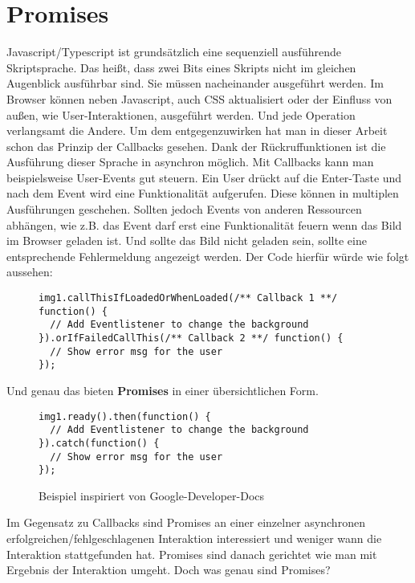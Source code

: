 \section{Promises}

Javascript/Typescript ist grundsätzlich eine sequenziell ausführende Skriptsprache. Das heißt,  dass zwei Bits eines Skripts nicht im gleichen Augenblick ausführbar sind. Sie müssen nacheinander ausgeführt werden. Im Browser können neben Javascript, auch CSS aktualisiert oder der Einfluss von außen, wie User-Interaktionen, ausgeführt werden. Und jede Operation verlangsamt die Andere. Um dem entgegenzuwirken hat man in dieser Arbeit schon das Prinzip der Callbacks gesehen. Dank der Rückruffunktionen ist die Ausführung dieser Sprache in asynchron möglich. Mit Callbacks kann man beispielsweise User-Events gut steuern. Ein User drückt auf die Enter-Taste und nach dem Event wird eine Funktionalität aufgerufen. Diese können in multiplen Ausführungen geschehen. Sollten jedoch Events von anderen Ressourcen abhängen, wie z.B. das Event darf erst eine Funktionalität \glqq{}feuern\grqq{} wenn das Bild im Browser geladen ist. Und sollte das Bild nicht geladen sein, sollte eine entsprechende Fehlermeldung angezeigt werden. Der Code hierfür würde wie folgt aussehen:

\begin{figure}[H]
\begin{lstlisting}
img1.callThisIfLoadedOrWhenLoaded(/** Callback 1 **/ function() {
  // Add Eventlistener to change the background
}).orIfFailedCallThis(/** Callback 2 **/ function() {
  // Show error msg for the user
});
\end{lstlisting}
\end{figure}

\noindent
Und genau das bieten \textbf{Promises} in einer übersichtlichen Form.

\begin{figure}[H]
\begin{lstlisting}
img1.ready().then(function() {
  // Add Eventlistener to change the background
}).catch(function() {
  // Show error msg for the user
});
\end{lstlisting}
\caption{Beispiel inspiriert von Google-Developer-Docs \cite{callback-vs-promises}}
\end{figure}

\noindent
Im Gegensatz zu Callbacks sind Promises an einer einzelner asynchronen erfolgreichen/fehlgeschlagenen Interaktion interessiert und weniger wann die Interaktion stattgefunden hat. Promises sind danach gerichtet wie man mit Ergebnis der Interaktion umgeht. 
Doch was genau sind Promises? \\

